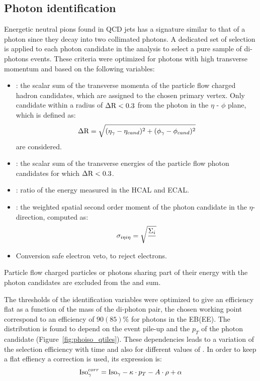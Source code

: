 \subsection{Photon identification}
Energetic neutral pions found in QCD jets has a signature similar to that of a photon since they decay into two collimated
photons. A dedicated set of selection is applied to each photon candidate in the analysis to select a pure
sample of di-photons events. These criteria were optimized for photons with high transverse
momentum and based on the following variables:

\begin{itemize}  
\item \chIso: the scalar sum of the transverse momenta of the particle flow charged hadron
candidates, which are assigned to the chosen primary vertex. Only candidate
within a radius of $\Delta\mathrm{R} < 0.3$ from the photon in the $\eta$ - $\phi$ plane, which is
defined as:
\[
\Delta\mathrm{R} = \sqrt{(\eta_\gamma-\eta_{cand})^2 + (\phi_\gamma-\phi_{cand})^2}
  \]
are considered.

\item \phoIso: the scalar sum of the transverse energies of the particle flow photon candidates for which $\Delta\mathrm{R} < 0.3$.
  
\item \hoe: ratio of the energy measured in the HCAL and ECAL.

\item \sieie: the weighted spatial second order moment of the photon candidate in the
  $\eta$-direction, computed as:
  \[
\sigma_{i\eta i\eta} = \sqrt{\frac{\Sigma_{i}{}}{}}
\]

\item Conversion safe electron veto, to reject electrons.

\end{itemize}

Particle flow charged particles or photons sharing part of their energy with the photon candidates
are excluded from the \chIso and \phoIso sum. 

The thresholds of the identification variables were optimized to give an efficiency flat as a function
of the mass of the di-photon pair, the chosen working point correspond to an efficiency of $90(85)\%$ for
photons in the EB(EE).
The \phoIso distribution is found to depend on the event pile-up and the $p_T$ of the
photon candidate (Figure~\ref{fig:phoiso_qtiles}).
These dependencies leads to a variation of the selection efficiency with time and also
for different values of \mgg. In order to keep a flat effiency a correction is used, its expression is:
\[
  \mathrm{Iso}_\gamma^{corr} = \mathrm{Iso}_\gamma - \kappa\cdot p_T - A \cdot \rho + \alpha
\]

